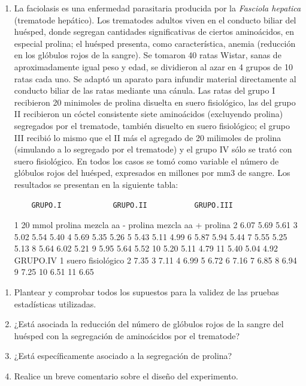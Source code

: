 \documentclass[]{book}
\providecommand{\tightlist}{%
  \setlength{\itemsep}{0pt}\setlength{\parskip}{0pt}}
\theoremstyle{definition}
\theoremstyle{definition}
\theoremstyle{definition}
\theoremstyle{remark}
\begin{document}
\begin{enumerate}
\def\labelenumi{\arabic{enumi}.}
\setcounter{enumi}{3}
\item
  La faciolasis es una enfermedad parasitaria producida por la
  \emph{Fasciola hepatica} (trematode hepático). Los trematodes adultos
  viven en el conducto biliar del huésped, donde segregan cantidades
  significativas de ciertos aminoácidos, en especial prolina; el huésped
  presenta, como característica, anemia (reducción en los glóbulos rojos
  de la sangre). Se tomaron 40 ratas Wistar, sanas de aproximadamente
  igual peso y edad, se dividieron al azar en 4 grupos de 10 ratas cada
  uno. Se adaptó un aparato para infundir material directamente al
  conducto biliar de las ratas mediante una cánula. Las ratas del grupo
  I recibieron 20 minimoles de prolina disuelta en suero fisiológico,
  las del grupo II recibieron un cóctel consistente siete aminoácidos
  (excluyendo prolina) segregados por el trematode, también disuelto en
  suero fisiológico; el grupo III recibió lo mismo que el II más el
  agregado de 20 milimoles de prolina (simulando a lo segregado por el
  trematode) y el grupo IV sólo se trató con suero fisiológico. En todos
  los casos se tomó como variable el número de glóbulos rojos del
  huésped, expresados en millones por mm3 de sangre. Los resultados se
  presentan en la siguiente tabla:

\begin{verbatim}
    GRUPO.I            GRUPO.II           GRUPO.III
\end{verbatim}

  1 20 mmol prolina mezcla aa - prolina mezcla aa + prolina 2 6.07 5.69
  5.61 3 5.02 5.54 5.40 4 5.69 5.35 5.26 5 5.43 5.11 4.99 6 5.87 5.94
  5.44 7 5.55 5.25 5.13 8 5.64 6.02 5.21 9 5.95 5.64 5.52 10 5.20 5.11
  4.79 11 5.40 5.04 4.92 GRUPO.IV 1 suero fisiológico 2 7.35 3 7.11 4
  6.99 5 6.72 6 7.16 7 6.85 8 6.94 9 7.25 10 6.51 11 6.65
\end{enumerate}

\begin{enumerate}
\def\labelenumi{\alph{enumi})}
\tightlist
\item
  Plantear y comprobar todos los supuestos para la validez de las
  pruebas estadísticas utilizadas.
\item
  ¿Está asociada la reducción del número de glóbulos rojos de la sangre
  del huésped con la segregación de aminoácidos por el trematode?
\item
  ¿Está específicamente asociado a la segregación de prolina?
\item
  Realice un breve comentario sobre el diseño del experimento.
\end{enumerate}
\end{document}
